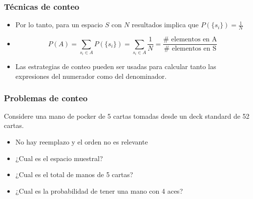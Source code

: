 \documentclass[table]{beamer}
\begin{document}
\begin{frame}
    \frametitle{Técnicas de conteo}

	\begin{itemize}
		\item Por lo tanto, para un espacio $S$ con $N$ resultados implica que $P(\{s_i\})=\frac{1}{N}$
		\item $$ P(A)=\sum_{s_i\in A}P(\{s_i\})= \sum_{s_i\in A}\frac{1}{N} =\frac{\#\mbox{ elementos en A}}{\#\mbox{ elementos en S}}$$
		\item Las estrategias de conteo pueden ser usadas para calcular tanto las expresiones del numerador como del denominador.
	\end{itemize}

\end{frame}


\begin{frame}
    \frametitle{Problemas de conteo}
		Considere una mano de pocker de 5 cartas tomadas desde un deck standard de 52 cartas. 
		\begin{itemize}
			\item No hay reemplazo y el orden no es relevante
			\item ¿Cual es el espacio muestral?

			\item ¿Cual es el total de manos de 5 cartas?

			\item ¿Cual es la probabilidad de tener una mano con 4 aces?
		\end{itemize}


\end{frame}
\end{document}
